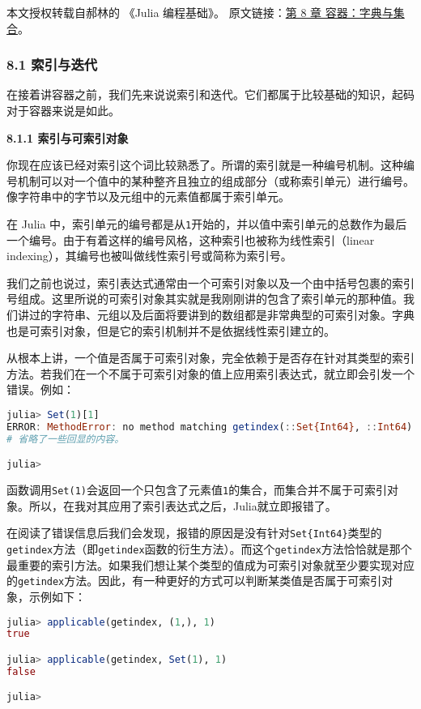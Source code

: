 
本文授权转载自郝林的 《Julia 编程基础》。 原文链接：\href{https://github.com/hyper0x/JuliaBasics/blob/master/book/ch08.md}{第 8 章 容器：字典与集合}。


\subsubsection{8.1 索引与迭代}

在接着讲容器之前，我们先来说说索引和迭代。它们都属于比较基础的知识，起码对于容器来说是如此。

\textbf{8.1.1 索引与可索引对象}

你现在应该已经对索引这个词比较熟悉了。所谓的索引就是一种编号机制。这种编号机制可以对一个值中的某种整齐且独立的组成部分（或称索引单元）进行编号。像字符串中的字节以及元组中的元素值都属于索引单元。

在 Julia 中，索引单元的编号都是从\verb|1|开始的，并以值中索引单元的总数作为最后一个编号。由于有着这样的编号风格，这种索引也被称为线性索引（linear indexing），其编号也被叫做线性索引号或简称为索引号。

我们之前也说过，索引表达式通常由一个可索引对象以及一个由中括号包裹的索引号组成。这里所说的可索引对象其实就是我刚刚讲的包含了索引单元的那种值。我们讲过的字符串、元组以及后面将要讲到的数组都是非常典型的可索引对象。字典也是可索引对象，但是它的索引机制并不是依据线性索引建立的。

从根本上讲，一个值是否属于可索引对象，完全依赖于是否存在针对其类型的索引方法。若我们在一个不属于可索引对象的值上应用索引表达式，就立即会引发一个错误。例如：
\begin{lstlisting}[language=julia]
julia> Set(1)[1]
ERROR: MethodError: no method matching getindex(::Set{Int64}, ::Int64)
# 省略了一些回显的内容。

julia> 
\end{lstlisting}

函数调用\verb|Set(1)|会返回一个只包含了元素值\verb|1|的集合，而集合并不属于可索引对象。所以，在我对其应用了索引表达式之后，Julia就立即报错了。

在阅读了错误信息后我们会发现，报错的原因是没有针对\verb|Set{Int64}|类型的\verb|getindex|方法（即\verb|getindex|函数的衍生方法）。而这个\verb|getindex|方法恰恰就是那个最重要的索引方法。如果我们想让某个类型的值成为可索引对象就至少要实现对应的\verb|getindex|方法。因此，有一种更好的方式可以判断某类值是否属于可索引对象，示例如下：
\begin{lstlisting}[language=julia]
julia> applicable(getindex, (1,), 1)
true

julia> applicable(getindex, Set(1), 1)
false

julia> 
\end{lstlisting}

